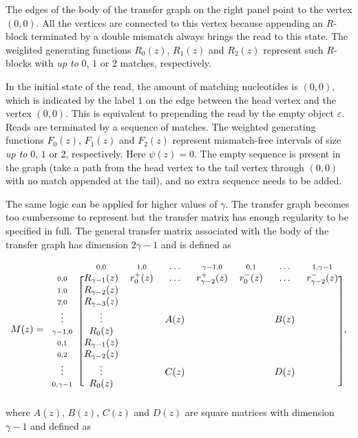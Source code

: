 \documentclass{article}
\begin{document}
The edges of the body of the transfer graph on the right panel point to
the vertex $(0,0)$. All the vertices are connected to this vertex because
appending an $R$-block terminated by a double mismatch always brings the
read to this state. The weighted generating functions $R_0(z)$, $R_1(z)$
and $R_2(z)$ represent such $R$-blocks with \emph{up to} $0$, $1$ or $2$
matches, respectively.

In the initial state of the read, the amount of matching nucleotides is
$(0,0)$, which is indicated by the label $1$ on the edge between the head
vertex and the vertex $(0,0)$. This is equivalent to prepending the read
by the empty object $\varepsilon$. Reads are terminated by a sequence of
matches. The weighted generating functions $F_0(z)$, $F_1(z)$ and $F_2(z)$
represent mismatch-free intervals of size \emph{up to} $0$, $1$ or $2$,
respectively. Here $\psi(z) = 0$. The empty sequence is present in the
graph (take a path from the head vertex to the tail vertex through $(0,0)$
with no match appended at the tail), and no extra sequence needs to be
added.

The same logic can be applied for higher values of $\gamma$. The transfer
graph becomes too cumbersome to represent but the transfer matrix has
enough regularity to be specified in full. The general transfer matrix
associated with the body of the transfer graph has dimension $2\gamma-1$
and is defined as


\begin{equation*}
M(z) =
\begin{blockarray}{cccccccc}
   & \scriptstyle{0,0} & \scriptstyle{1,0} & 
    \ldots & \scriptstyle{\gamma-1,0} &
    \scriptstyle{0,1} & \ldots &
    \scriptstyle{1,\gamma-1}\\
\begin{block}{c[ccccccc]}
\scriptstyle{0,0} & R_{\gamma-1}(z)  & r_0^+(z) & \ldots &
    r_{\gamma-2}^+(z) & r_0^-(z) & \ldots & r_{\gamma-2}^-(z) \\
\scriptstyle{1,0} & R_{\gamma-2}(z) \\
\scriptstyle{2,0} & R_{\gamma-3}(z) \\
\vdots & \vdots & & A(z) & & & B(z) \\
\scriptstyle{\gamma-1,0} & R_0(z) \\
\scriptstyle{0,1} & R_{\gamma-1}(z) \\
\scriptstyle{0,2} & R_{\gamma-2}(z) \\
\vdots & \vdots & & C(z) & & & D(z) \\
\scriptstyle{0,\gamma-1} & R_0(z) \\
\end{block}
\end{blockarray},
\end{equation*}
where $A(z)$, $B(z)$, $C(z)$ and $D(z)$ are square matrices with dimension
$\gamma-1$ and defined as
\end{document}
